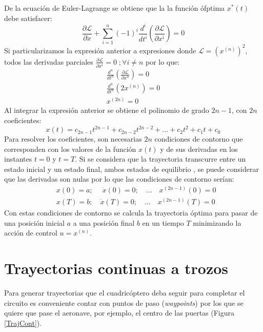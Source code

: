 De la  ecuación de Euler-Lagrange se obtiene que la la función ófptima $x^*(t)$ debe satisfacer:
\begin{equation}
	\frac{\partial\mathcal{L}}{\partial x} + \sum_{i=1}^{n}(-1)^i \frac{d^i}{dt^i}\left(\frac{\partial\mathcal{L}}{\partial x^i}\right)  = 0
\end{equation}
Si particularizamos la expresión anterior a expresiones donde $\mathcal{L} =\left(x^{(n)}\right)^2$, todos las derivadas parciales $\frac{\partial\mathcal{L}}{\partial x^i} = 0 \; ; \forall i \neq n$ por lo que:
\begin{align}
	\frac{d^n}{dt^n}\left(\frac{\partial\mathcal{L}}{\partial x^n}\right) = 0 \\
	\frac{d^n}{dt^n}\left(2 x^{(n)}\right) = 0\\
	x^{(2n)} = 0
\end{align}
Al integrar la expresión anterior se obtiene el polinomio de grado $2n-1$, con $2n$ coeficientes:
\begin{equation}
	x(t) = c_{2n-1}t^{2n-1} + c_{2n-2}t^{2n-2} + ... + c_2t^2 + c_1t + c_0
\end{equation}
Para resolver los coeficientes, son necesarias $2n$ condiciones de contorno que corresponden con los valores de la función $x(t)$ y de sus derivadas en los instantes $t=0$ y $t = T$. Si se considera que la trayectoria transcurre entre un estado inicial y un estado final, ambos estados de equilibrio , se puede considerar que las derivadas son nulas por lo que las condiciones de contorno serían:
\begin{align}
 	&x(0) = a; \quad \;\dot{x}(0) = 0;  \quad...\quad x^{(2n-1)}(0) = 0\\
	&x(T) = b;\quad \dot{x}(T) = 0;  \quad...\quad x^{(2n-1)}(T) = 0
\end{align}
Con estas condiciones de contorno se calcula la trayectoria óptima para pasar de una posición inicial $a$ a una posición final $b$ en un tiempo $T$ minimizando la acción de control $u = x^{(n)}$. 



\section{Trayectorias continuas a trozos}
Para generar trayectorias que el cuadricóptero deba seguir para completar el circuito es conveniente contar con puntos de paso (\textit{waypoints}) por los que se quiere que pase el aeronave, por ejemplo, el centro de las puertas (Figura \ref{TrajCont}).


